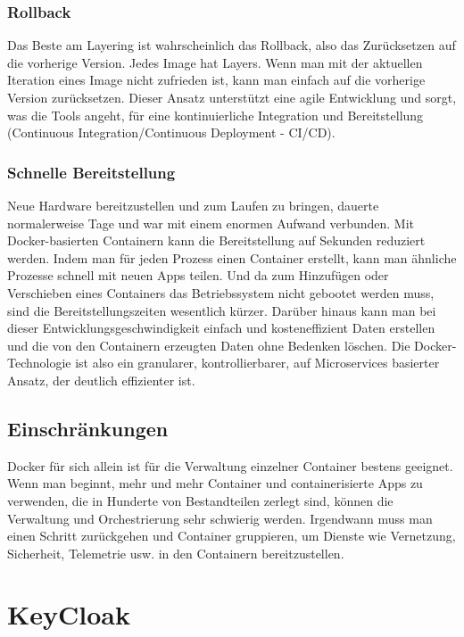 \subsubsection{Rollback}

Das Beste am Layering ist wahrscheinlich das Rollback, also das Zurücksetzen auf die vorherige Version. Jedes Image hat Layers. Wenn man mit der aktuellen Iteration eines Image nicht zufrieden ist, kann man einfach
auf die vorherige Version zurücksetzen. Dieser Ansatz unterstützt eine agile Entwicklung und sorgt, was die Tools angeht, 
für eine kontinuierliche Integration und Bereitstellung (Continuous Integration/Continuous Deployment - CI/CD).
\cite{sysarch-docker-1}

\subsubsection{Schnelle Bereitstellung}

Neue Hardware bereitzustellen und zum Laufen zu bringen, dauerte normalerweise Tage und war mit einem enormen Aufwand verbunden. Mit Docker-basierten Containern kann die Bereitstellung auf Sekunden reduziert werden. 
Indem man für jeden Prozess einen Container erstellt, kann man ähnliche Prozesse schnell mit neuen Apps teilen. Und da zum Hinzufügen oder Verschieben eines Containers das 
Betriebssystem nicht gebootet werden muss, sind die Bereitstellungszeiten wesentlich kürzer. Darüber hinaus kann man bei dieser Entwicklungsgeschwindigkeit 
einfach und kosteneffizient Daten erstellen und die von den Containern erzeugten Daten ohne Bedenken löschen.
Die Docker-Technologie ist also ein granularer, kontrollierbarer, auf Microservices basierter Ansatz, der deutlich effizienter ist.
\cite{sysarch-docker-1}

\subsection{Einschränkungen}

Docker für sich allein ist für die Verwaltung einzelner Container bestens geeignet. Wenn man beginnt, mehr und mehr Container und containerisierte Apps zu verwenden, 
die in Hunderte von Bestandteilen zerlegt sind, können die Verwaltung und Orchestrierung sehr schwierig werden. Irgendwann muss man einen Schritt zurückgehen und Container gruppieren, 
um Dienste wie Vernetzung, Sicherheit, Telemetrie usw. in den Containern bereitzustellen.
\cite{sysarch-docker-1}

\section{KeyCloak}

